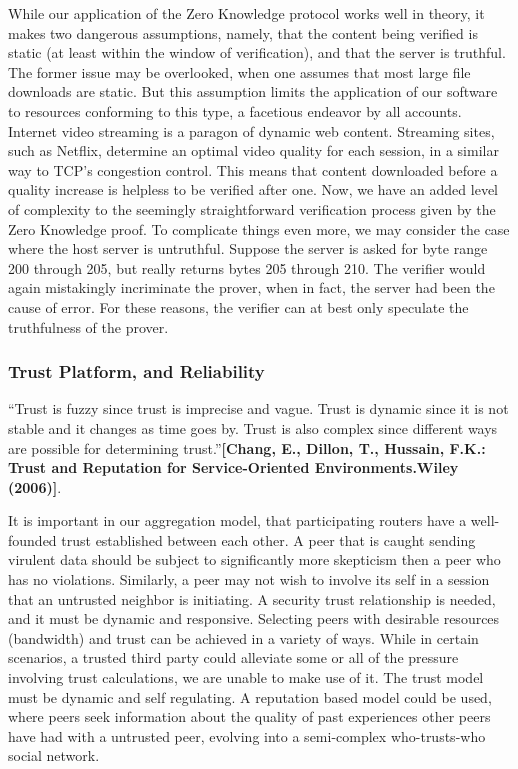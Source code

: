\documentclass[12pt]{article}
\newcommand{\lcite}[1]
{{\bfseries\color{orange}[#1]}}
\begin{document}
		While our application of the Zero Knowledge protocol works well in theory, it makes two dangerous assumptions, namely, that the content being verified is static (at least within the window of verification), and that the server is truthful. The former issue may be overlooked, when one assumes that most large file downloads are static. But this assumption limits the application of our software to resources conforming to this type, a facetious endeavor by all accounts. Internet video streaming is a paragon of dynamic web content. Streaming sites, such as Netflix, determine an optimal video quality for each session, in a similar way to TCP's congestion control. This means that content downloaded before a quality increase is helpless to be verified after one. Now, we have an added level of complexity to the seemingly straightforward verification process given by the Zero Knowledge proof. To complicate things even more, we may consider the case where the host server is untruthful. Suppose the server is asked for byte range 200 through 205, but really returns bytes 205 through 210. The verifier would again mistakingly incriminate the prover, when in fact, the server had been the cause of error. For these reasons, the verifier can at best only speculate the truthfulness of the prover.

		\subsubsection{Trust Platform, and Reliability}

			``Trust is fuzzy since trust is imprecise and vague. Trust is dynamic since it is not stable and it changes as time goes by. Trust is also complex since different ways are possible for determining trust.''\lcite{Chang, E., Dillon, T., Hussain, F.K.: Trust and Reputation for Service-Oriented Environments.Wiley (2006)}. 

			It is important in our aggregation model, that participating routers have a well-founded trust established between each other. A peer that is caught sending virulent data should be subject to significantly more skepticism then a peer who has no violations. Similarly, a peer may not wish to involve its self in a session that an untrusted neighbor is initiating. A security trust relationship is needed, and it must be dynamic and responsive. Selecting peers with desirable resources (bandwidth) and trust can be achieved in a variety of ways. While in certain scenarios, a trusted third party could alleviate some or all of the pressure involving trust calculations, we are unable to make use of it. The trust model must be dynamic and self regulating. A reputation based model could be used, where peers seek information about the quality of past experiences other peers have had with a untrusted peer, evolving into a semi-complex who-trusts-who social network.
\end{document}
